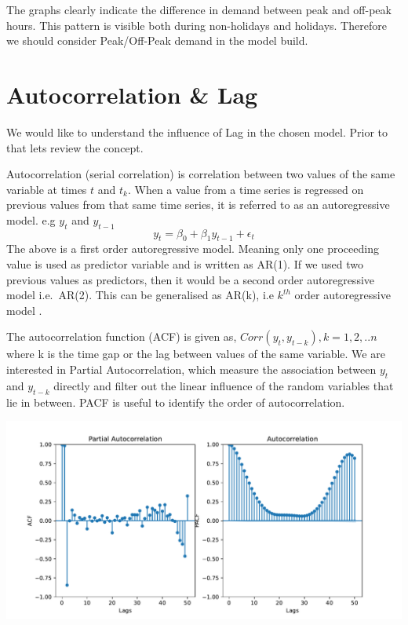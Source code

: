 \documentclass[mstat,12pt]{unswthesis}
\begin{document}
The graphs clearly indicate the difference in demand between peak and
off-peak hours. This pattern is visible both during non-holidays and
holidays. Therefore we should consider Peak/Off-Peak demand in the model
build.

\section{Autocorrelation \& Lag}\label{autocorrelation-lag}

We would like to understand the influence of Lag in the chosen model.
Prior to that lets review the concept.

Autocorrelation (serial correlation) is correlation between two values
of the same variable at times \(t\) and \(t_k\). When a value from a
time series is regressed on previous values from that same time series,
it is referred to as an autoregressive model. e.g \(y_t\) and
\(y_{t-1}\) \[ y_t = \beta_0 + \beta_1 y_{t-1} + \epsilon_t\] The above
is a first order autoregressive model. Meaning only one proceeding value
is used as predictor variable and is written as AR(1). If we used two
previous values as predictors, then it would be a second order
autoregressive model i.e.~AR(2). This can be generalised as AR(k), i.e
\(k^{th}\) order autoregressive model
\cite{thepennsylvaniastateuniversity_102}.

The autocorrelation function (ACF) is given as,
\(Corr(y_t,y_{t-k}),k=1,2,..n\) \cite{nist_2020_13512} where k is the
time gap or the lag between values of the same variable. We are
interested in Partial Autocorrelation, which measure the association
between \(y_t\) and \(y_{t-k}\) directly and filter out the linear
influence of the random variables that lie in between. PACF is useful to
identify the order of autocorrelation.

\begin{center}\includegraphics[width=0.7\linewidth]{unsw-ZZSC9020-report-template_files/figure-latex/unnamed-chunk-10-15} \end{center}
\end{document}
